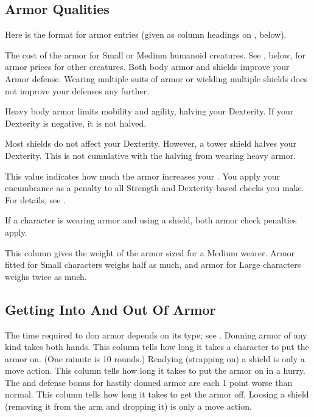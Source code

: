     \subsection{Armor Qualities}
        \par Here is the format for armor entries (given as column headings on , below).

         The cost of the armor for Small or Medium humanoid creatures.
        See , below, for armor prices for other creatures.
         Both body armor and shields improve your Armor defense.
        Wearing multiple suits of armor or wielding multiple shields does not improve your defenses any further.

         Heavy body armor limits mobility and agility, halving your Dexterity.
        If your Dexterity is negative, it is not halved.

         Most shields do not affect your Dexterity.
        However, a tower shield halves your Dexterity.
        This is not cumulative with the halving from wearing heavy armor.

         This value indicates how much the armor increases your .
        You apply your encumbrance as a penalty to all Strength and Dexterity-based checks you make.
        For details, see .

         If a character is wearing armor and using a shield, both armor check penalties apply.

         This column gives the weight of the armor sized for a Medium wearer. Armor fitted for Small characters weighs half as much, and armor for Large characters weighs twice as much.

    \subsection{Getting Into And Out Of Armor}
        The time required to don armor depends on its type; see . Donning armor of any kind takes both hands.
         This column tells how long it takes a character to put the armor on. (One minute is 10 rounds.) Readying (strapping on) a shield is only a move action.
         This column tells how long it takes to put the armor on in a hurry. The  and defense bonus for hastily donned armor are each 1 point worse than normal.
         This column tells how long it takes to get the armor off. Loosing a shield (removing it from the arm and dropping it) is only a move action.


